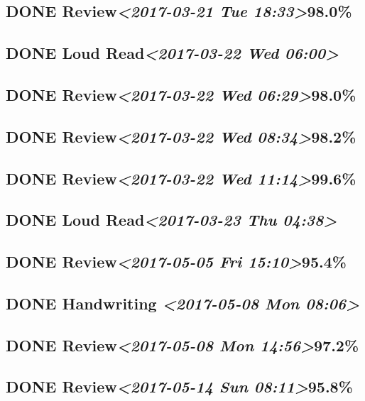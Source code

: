 \documentclass[11pt]{ctexart}
\begin{document}
\subsection{{\bfseries\sffamily DONE} Review\textit{<2017-03-21 Tue 18:33>}98.0\%}
\label{sec:orgff366f8}
\subsection{{\bfseries\sffamily DONE} Loud Read\textit{<2017-03-22 Wed 06:00>}}
\label{sec:orgf84f916}
\subsection{{\bfseries\sffamily DONE} Review\textit{<2017-03-22 Wed 06:29>}98.0\%}
\label{sec:orge629508}
\subsection{{\bfseries\sffamily DONE} Review\textit{<2017-03-22 Wed 08:34>}98.2\%}
\label{sec:org38c1c36}
\subsection{{\bfseries\sffamily DONE} Review\textit{<2017-03-22 Wed 11:14>}99.6\%}
\label{sec:org4a545ea}
\subsection{{\bfseries\sffamily DONE} Loud Read\textit{<2017-03-23 Thu 04:38>}}
\label{sec:org7af4cfa}
\subsection{{\bfseries\sffamily DONE} Review\textit{<2017-05-05 Fri 15:10>}95.4\%}
\label{sec:org8eb84c5}
\subsection{{\bfseries\sffamily DONE} Handwriting \textit{<2017-05-08 Mon 08:06>}}
\label{sec:org72493a8}
\subsection{{\bfseries\sffamily DONE} Review\textit{<2017-05-08 Mon 14:56>}97.2\%}
\label{sec:orgfd59b27}
\subsection{{\bfseries\sffamily DONE} Review\textit{<2017-05-14 Sun 08:11>}95.8\%}
\label{sec:orgcf96d4f}
\end{document}
